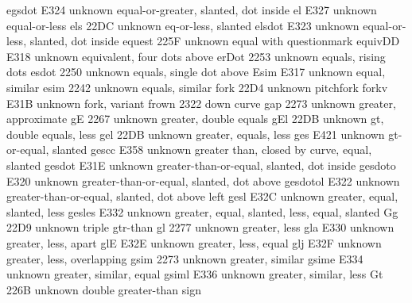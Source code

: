  egsdot                E324 {unknown} equal-or-greater, slanted, dot inside
 el                    E327 {unknown} equal-or-less
 els                   22DC {unknown} eq-or-less, slanted
 elsdot                E323 {unknown} equal-or-less, slanted, dot inside
 equest                225F {unknown} equal with questionmark
 equivDD               E318 {unknown} equivalent, four dots above
 erDot                 2253 {unknown} equals, rising dots
 esdot                 2250 {unknown} equals, single dot above
 Esim                  E317 {unknown} equal, similar
 esim                  2242 {unknown} equals, similar
 fork                  22D4 {unknown} pitchfork
 forkv                 E31B {unknown} fork, variant
 frown                 2322 {\frown} down curve
 gap                   2273 {unknown} greater, approximate
 gE                    2267 {unknown} greater, double equals
 gEl                   22DB {unknown} gt, double equals, less
 gel                   22DB {unknown} greater, equals, less
 ges                   E421 {unknown} gt-or-equal, slanted
 gescc                 E358 {unknown} greater than, closed by curve, equal, slanted
 gesdot                E31E {unknown} greater-than-or-equal, slanted, dot inside
 gesdoto               E320 {unknown} greater-than-or-equal, slanted, dot above
 gesdotol              E322 {unknown} greater-than-or-equal, slanted, dot above left
 gesl                  E32C {unknown} greater, equal, slanted, less
 gesles                E332 {unknown} greater, equal, slanted, less, equal, slanted
 Gg                    22D9 {unknown} triple gtr-than
 gl                    2277 {unknown} greater, less
 gla                   E330 {unknown} greater, less, apart
 glE                   E32E {unknown} greater, less, equal
 glj                   E32F {unknown} greater, less, overlapping
 gsim                  2273 {unknown} greater, similar
 gsime                 E334 {unknown} greater, similar, equal
 gsiml                 E336 {unknown} greater, similar, less
 Gt                    226B {unknown} double greater-than sign
